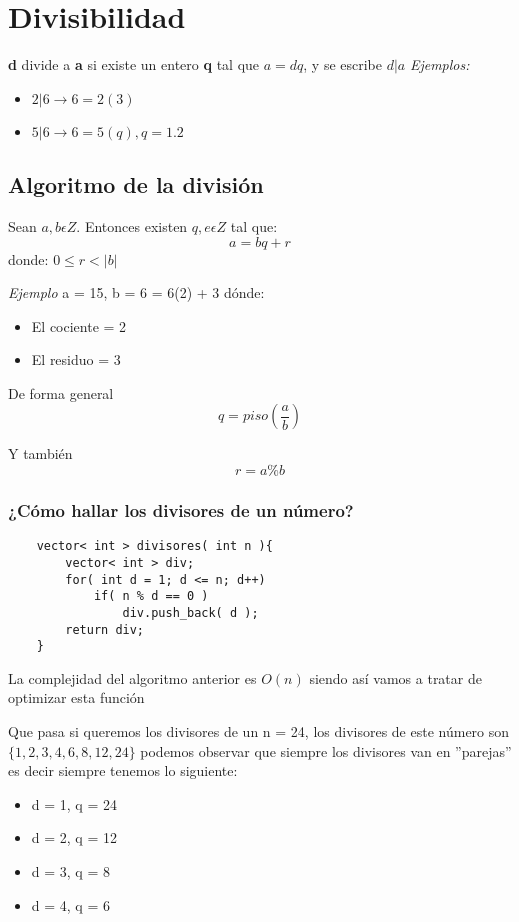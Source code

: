 \section{Divisibilidad}
\textbf{d} divide a \textbf{a} si existe un entero \textbf{q} tal que $a = dq$, y se escribe $d|a$\newline
\textit{Ejemplos:}\break 
\begin{itemize}
    \item {$2|6 \rightarrow 6 = 2(3)$}
    \item {$5|6 \rightarrow 6 = 5(q), q = 1.2$}
\end{itemize}

\subsection{Algoritmo de la división}
Sean \textbf{$a,b \epsilon Z$}. Entonces existen \textbf{$q, e \epsilon Z$} tal que:\newline
\[ a = bq + r \]
donde: $0 \leq r < |b|$ \newline

\textit{Ejemplo} \newline
a = 15, b = 6  = 6(2) + 3 \newline 
dónde: 
\begin{itemize}
    \item {El cociente = 2}
    \item {El residuo = 3}
\end{itemize}

De forma general 
\[
    q = piso \left ( \frac{a}{b} \right )
\]

Y también 
\[
    r = a \% b    
\]

\subsubsection{¿Cómo hallar los divisores de un número?}
\begin{lstlisting}
    vector< int > divisores( int n ){
        vector< int > div;
        for( int d = 1; d <= n; d++)
            if( n % d == 0 )
                div.push_back( d );
        return div;
    }
\end{lstlisting}
La complejidad del algoritmo anterior es $O(n)$ siendo así vamos a tratar de optimizar esta función\newline

Que pasa si queremos los divisores de un n = 24, los divisores de este número son $\{1, 2, 3, 4, 6, 8, 12, 24\}$ podemos observar que siempre los divisores van en ''parejas'' es decir siempre tenemos lo siguiente: \newline
\begin{itemize}
    \item {d = 1, q = 24}
    \item {d = 2, q = 12}
    \item {d = 3, q = 8}
    \item {d = 4, q = 6}
\end{itemize}

